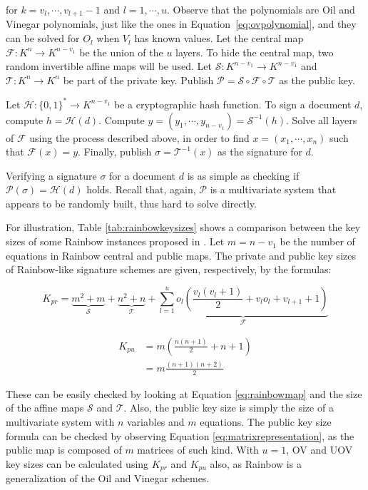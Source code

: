 \documentclass{ufsctex/ufsctex}
\begin{document}
for $k = v_l, \cdots, v_{l+1} - 1$ and $l = 1, \cdots, u$. Observe that the
polynomials are Oil and Vinegar polynomials, just like the ones in
Equation~\ref{eq:ovpolynomial}, and they can be solved for $O_l$ when $V_l$ has
known values. Let the central map $\mathcal{F}:K^{n} \to K^{n-v_1}$ be the
union of the $u$ layers. To hide the central map, two random invertible affine
maps will be used. Let $\mathcal{S}:K^{n-v_1} \to K^{n-v_1}$ and
$\mathcal{T}:K^{n} \to K^{n}$ be part of the private key. Publish $\mathcal{P}
= \mathcal{S} \circ \mathcal{F} \circ \mathcal{T}$ as the public key.

Let $\mathcal{H}: \{0,1\}^* \to K^{n-v_1}$ be a cryptographic hash function. To
sign a document $d$, compute $h = \mathcal{H}(d)$. Compute $y = (y_1, \cdots,
y_{n-v_1}) = \mathcal{S}^{-1}(h)$. Solve all layers of $\mathcal{F}$ using the
process described above, in order to find $x = (x_1, \cdots, x_n)$ such that
$\mathcal{F}(x) = y$. Finally, publish $\sigma = \mathcal{T}^{-1}(x)$ as the
signature for $d$.

Verifying a signature $\sigma$ for a document $d$ is as simple as checking if
$\mathcal{P}(\sigma) = \mathcal{H}(d)$ holds. Recall that, again, $\mathcal{P}$
is a multivariate system that appears to be randomly built, thus hard to solve
directly.

For illustration, Table \ref{tab:rainbowkeysizes} shows a comparison between
the key sizes of some Rainbow instances proposed in \cite[Chapter
6]{petzoldt2013thesis}. Let $m = n - v_1$ be the number of equations in Rainbow
central and public maps. The private and public key sizes of Rainbow-like
signature schemes are given, respectively, by the formulas:

\begin{equation}\label{eq:rainbowprivatekeysize}
K_{pr} =
\underbrace{m^2 + m}_{\mathcal{S}} + \underbrace{n^2 + n}_{\mathcal{T}} +
\underbrace{\sum_{l=1}^{u} o_l \left(
\frac{v_l(v_l + 1)}{2} + v_l o_l + v_{l+1} + 1
\right)}_{\mathcal{F}}
\end{equation}

\begin{equation}
\begin{split}
K_{pu} &= m \left( \frac{n (n + 1)}{2} + n + 1 \right) \\
&= m \frac{(n+1)(n+2)}{2}
\end{split}
\end{equation}

These can be easily checked by looking at Equation \ref{eq:rainbowmap} and the
size of the affine maps $\mathcal{S}$ and $\mathcal{T}$. Also, the public key
size is simply the size of a multivariate system with $n$ variables and $m$
equations. The public key size formula can be checked by observing Equation
\ref{eq:matrixrepresentation}, as the public map is composed of $m$ matrices of
such kind. With $u=1$, OV and UOV key sizes can be calculated using $K_{pr}$
and $K_{pu}$ also, as Rainbow is a generalization of the Oil and Vinegar
schemes.
\end{document}
